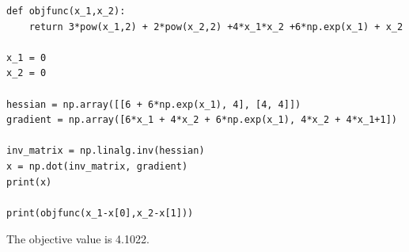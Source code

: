 \documentclass[12pt]{article}
\begin{document}
\begin{enumerate}
\begin{enumerate}
\begin{lstlisting}
def objfunc(x_1,x_2):
    return 3*pow(x_1,2) + 2*pow(x_2,2) +4*x_1*x_2 +6*np.exp(x_1) + x_2

x_1 = 0
x_2 = 0

hessian = np.array([[6 + 6*np.exp(x_1), 4], [4, 4]])
gradient = np.array([6*x_1 + 4*x_2 + 6*np.exp(x_1), 4*x_2 + 4*x_1+1])

inv_matrix = np.linalg.inv(hessian)
x = np.dot(inv_matrix, gradient)
print(x)

print(objfunc(x_1-x[0],x_2-x[1]))
                  \end{lstlisting}
                        The objective value is 4.1022.
            \end{enumerate}
\end{enumerate}
\end{document}
